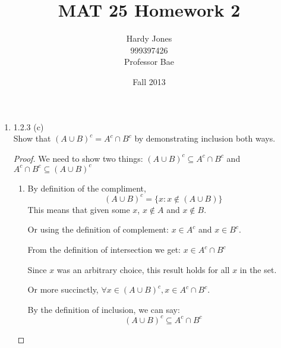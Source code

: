 \documentclass[12pt,letterpaper]{article}
\title{MAT 25 Homework 2\vspace{-2ex}}
\author{Hardy Jones\\
        999397426\\
        Professor Bae\vspace{-2ex}}
\date{Fall 2013}
\begin{document}
  \maketitle

  \begin{enumerate}
    \item 1.2.3 (c) \\
      Show that $(A \cup B)^c = A^c \cap B^c$
      by demonstrating inclusion both ways.

      \begin{proof}
        We need to show  two things:
        $(A \cup B)^c \subseteq A^c \cap B^c$
        and
        $A^c \cap B^c \subseteq (A \cup B)^c$

        \begin{enumerate}
          \item
          By definition of the compliment,
          \[(A \cup B)^c = \{x : x \notin (A \cup B)\}\]
          This means that  given some $x$, $x \notin A$ and $x \notin B$.

          Or using the definition of complement:
          $x \in A^c$ and $x \in B^c$.

          From the definition of intersection we get:
          $x \in A^c \cap B^c$

          Since $x$ was an arbitrary choice,
          this result holds for all $x$ in the set.

          Or more succinctly, $\forall x \in (A \cup B)^c, x \in A^c \cap B^c$.

          By the definition of inclusion, we can say:
          \[(A \cup B)^c \subseteq A^c \cap B^c\]
        \end{enumerate}
      \end{proof}
  \end{enumerate}
\end{document}
